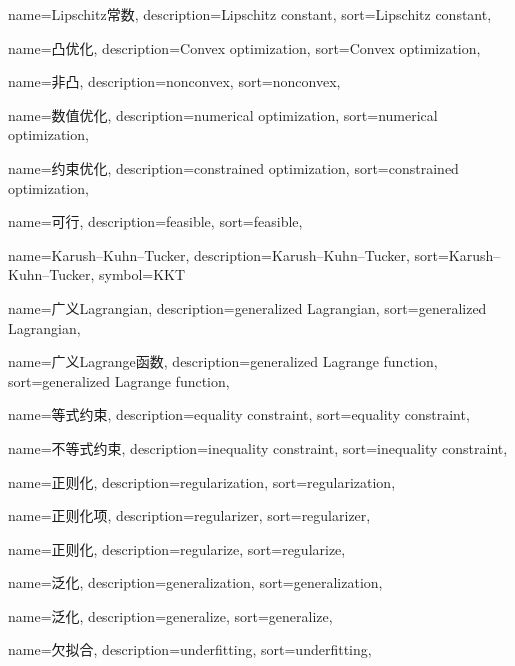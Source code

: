 {
  name=Lipschitz常数,
  description={Lipschitz constant},
  sort={Lipschitz constant},
}

{
  name=凸优化,
  description={Convex optimization},
  sort={Convex optimization},
}

{
	name=非凸,
	description={nonconvex},
	sort={nonconvex},
}

{
	name=数值优化,
	description={numerical optimization},
	sort={numerical optimization},
}

{
  name=约束优化,
  description={constrained optimization},
  sort={constrained optimization},
}

{
  name=可行,
  description={feasible},
  sort={feasible},
}

{
  name=Karush–Kuhn–Tucker,
  description={Karush–Kuhn–Tucker},
  sort={Karush–Kuhn–Tucker},
  symbol={KKT}
}

{
  name=广义Lagrangian,
  description={generalized Lagrangian},
  sort={generalized Lagrangian},
}

{
  name=广义Lagrange函数,
  description={generalized Lagrange function},
  sort={generalized Lagrange function},
}

{
  name=等式约束,
  description={equality constraint},
  sort={equality constraint},
}

{
  name=不等式约束,
  description={inequality constraint},
  sort={inequality constraint},
}

{
  name=正则化,
  description={regularization},
  sort={regularization},
}

{
  name=正则化项,
  description={regularizer},
  sort={regularizer},
}

{
  name=正则化,
  description={regularize},
  sort={regularize},
}

{
  name=泛化,
  description={generalization},
  sort={generalization},
}

{
	name=泛化,
	description={generalize},
	sort={generalize},
}

{
  name=欠拟合,
  description={underfitting},
  sort={underfitting},
}

